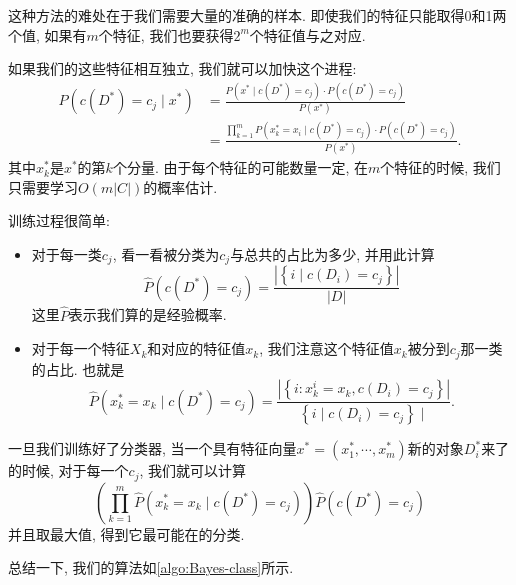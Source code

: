 这种方法的难处在于我们需要大量的准确的样本. 即使我们的特征只能取得0和1两个值, 如果有$m$个特征, 我们也要获得$2^m$个特征值与之对应. 

如果我们的这些特征相互独立, 我们就可以加快这个进程: 
$$
\begin{aligned}
P\left(c\left(D^*\right)=c_j \mid x^*\right) & =\frac{P\left(x^* \mid c\left(D^*\right)=c_j\right) \cdot P\left(c\left(D^*\right)=c_j\right)}{P\left(x^*\right)} \\
& =\frac{\prod_{k=1}^m P\left(x_k^*=x_i \mid c\left(D^*\right)=c_j\right) \cdot P\left(c\left(D^*\right)=c_j\right)}{P\left(x^*\right)} .
\end{aligned}
$$
其中$x_k^*$是$x^*$的第$k$个分量. 由于每个特征的可能数量一定, 在$m$个特征的时候, 我们只需要学习$O(m|C|)$的概率估计. 

训练过程很简单: 
\begin{itemize}
    \item 对于每一类$c_j$, 看一看被分类为$c_j$与总共的占比为多少, 并用此计算$$
    \hat{P}\left(c\left(D^*\right)=c_j\right)=\frac{\left|\left\{i \mid c\left(D_i\right)=c_j\right\}\right|}{|D|}
    $$这里$\hat P$表示我们算的是经验概率.
    \item 对于每一个特征$X_k$和对应的特征值$x_k$, 我们注意这个特征值$x_k$被分到$c_j$那一类的占比. 也就是$$
    \hat{P}\left(x_k^*=x_k \mid c\left(D^*\right)=c_j\right)=\frac{\left|\left\{i: x_k^i=x_k, c\left(D_i\right)=c_j\right\}\right|}{\left\{i \mid c\left(D_i\right)=c_j\right\} \mid} .
    $$
\end{itemize}

一旦我们训练好了分类器, 当一个具有特征向量$x^*=(x_1^*, \cdots, x_m^*)$新的对象$D_i^*$来了的时候, 对于每一个$c_j$, 我们就可以计算$$
\left(\prod_{k=1}^m \hat{P}\left(x_k^*=x_k \mid c\left(D^*\right)=c_j\right)\right) \hat{P}\left(c\left(D^*\right)=c_j\right)
$$
并且取最大值, 得到它最可能在的分类. 

总结一下, 我们的算法如\cref{algo:Bayes-class}所示. 


